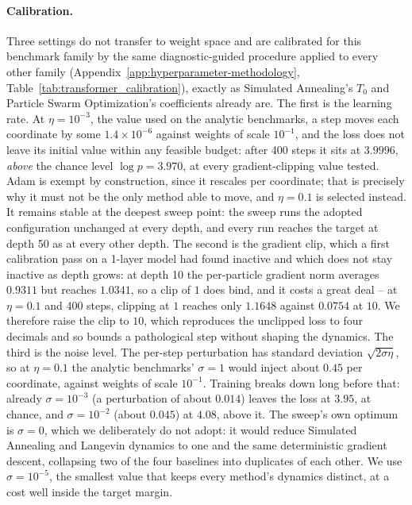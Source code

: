 \documentclass{article} %
\theoremstyle{plain}
\theoremstyle{definition}
\theoremstyle{remark}
\begin{document}
\paragraph{Calibration.} Three settings do not transfer to weight space and are calibrated for this benchmark family by the
same diagnostic-guided procedure applied to every other family
(Appendix~\ref{app:hyperparameter-methodology}, Table~\ref{tab:transformer_calibration}), exactly
as Simulated Annealing's $T_0$ and Particle Swarm Optimization's coefficients already are. The
first is the learning rate. At $\eta=10^{-3}$, the value used on the analytic benchmarks, a step
moves each coordinate by some $1.4\times10^{-6}$ against weights of scale $10^{-1}$, and the loss
does not leave its initial value within any feasible budget: after 400 steps it sits at $3.9996$,
\emph{above} the chance level $\log p=3.970$, at every gradient-clipping value tested. Adam is
exempt by construction, since it rescales per coordinate; that is precisely why it must not be the
only method able to move, and $\eta=0.1$ is selected instead. It remains stable at the deepest sweep point: the sweep runs the
adopted configuration unchanged at every depth, and every run reaches the target at depth 50 as at
every other depth.
The second is the gradient clip, which a first calibration pass on a 1-layer model had found
inactive and which does not stay inactive as depth grows: at depth 10 the per-particle gradient
norm averages $0.9311$ but reaches $1.0341$, so a clip of $1$ does bind, and it costs a great
deal -- at $\eta=0.1$ and 400 steps, clipping at $1$ reaches only $1.1648$ against $0.0754$ at
$10$. We therefore raise the clip to $10$, which reproduces the unclipped loss to four decimals
and so bounds a pathological step without shaping the dynamics. The third is the noise level. The per-step perturbation has standard deviation
$\sqrt{2\sigma\eta}$, so at $\eta=0.1$ the analytic benchmarks' $\sigma=1$ would inject about $0.45$
per coordinate, against weights of scale $10^{-1}$. Training breaks down long before that: already
$\sigma=10^{-3}$ (a perturbation of about $0.014$) leaves the loss at $3.95$, at chance, and
$\sigma=10^{-2}$ (about $0.045$) at $4.08$, above it. The sweep's own optimum is
$\sigma=0$, which we deliberately do not adopt: it would reduce Simulated Annealing and Langevin
dynamics to one and the same deterministic gradient descent, collapsing two of the four baselines
into duplicates of each other. We use $\sigma=10^{-5}$, the
smallest value that keeps every method's dynamics distinct, at a cost well inside the target
margin.
\end{document}
